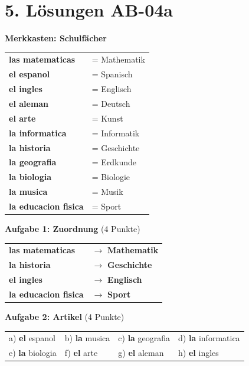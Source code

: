 \documentclass[11pt, a4paper]{article}
\newcommand{\fachfarbe}{spanisch}
\newcommand{\sequenz}{04}
\newcommand{\block}{a}
\newcommand{\loesung}[1]{\textcolor{loesung}{\textbf{#1}}}
\newcommand{\es}[1]{\textcolor{\fachfarbe}{\textbf{#1}}}
\begin{document}

\section*{5. Lösungen AB-\sequenz\block}

\textbf{Merkkasten: Schulfächer}

\begin{tabular}{ll}
\es{las matematicas} & = Mathematik \\
\es{el espanol} & = Spanisch \\
\es{el ingles} & = Englisch \\
\es{el aleman} & = Deutsch \\
\es{el arte} & = Kunst \\
\es{la informatica} & = Informatik \\
\es{la historia} & = Geschichte \\
\es{la geografia} & = Erdkunde \\
\es{la biologia} & = Biologie \\
\es{la musica} & = Musik \\
\es{la educacion fisica} & = Sport \\
\end{tabular}

\vspace{1em}

\textbf{Aufgabe 1: Zuordnung} (4 Punkte)

\begin{tabular}{ll}
\es{las matematicas} & $\rightarrow$ \loesung{Mathematik} \\
\es{la historia} & $\rightarrow$ \loesung{Geschichte} \\
\es{el ingles} & $\rightarrow$ \loesung{Englisch} \\
\es{la educacion fisica} & $\rightarrow$ \loesung{Sport} \\
\end{tabular}

\vspace{1em}

\textbf{Aufgabe 2: Artikel} (4 Punkte)

\begin{tabular}{llll}
a) \loesung{el} espanol & b) \loesung{la} musica & c) \loesung{la} geografia & d) \loesung{la} informatica \\
e) \loesung{la} biologia & f) \loesung{el} arte & g) \loesung{el} aleman & h) \loesung{el} ingles \\
\end{tabular}
\end{document}
